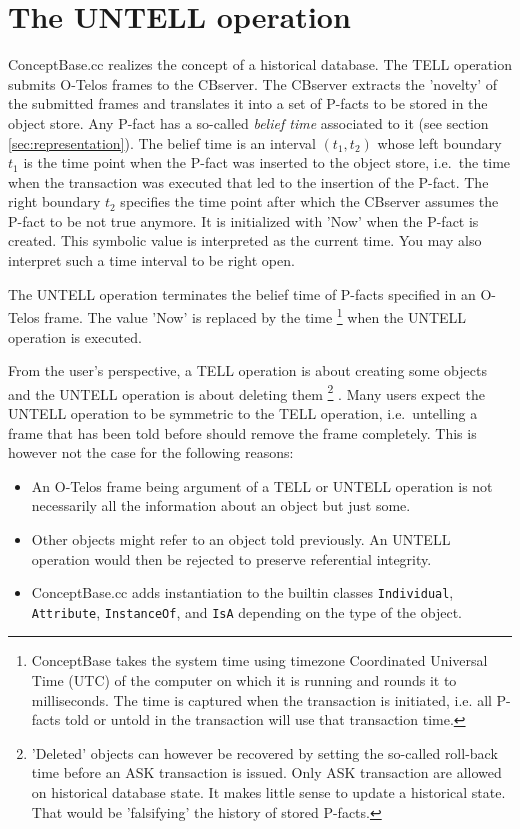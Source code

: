 \section{The UNTELL operation}
\label{sec:untell}

ConceptBase.cc realizes the concept of a historical database. The TELL operation
submits O-Telos frames to the CBserver. The CBserver extracts the 'novelty'
of the submitted frames and translates it into a set of P-facts to be stored
in the object store. Any P-fact has a so-called {\em belief time\/} associated to
it (see section \ref{sec:representation}). The belief time is an interval $(t_1,t_2)$ whose left boundary $t_1$ is the time point when
the P-fact was inserted to the object store, i.e.\ the time when the transaction
was executed that led to the insertion of the P-fact. The right boundary $t_2$ specifies
the time point after which the CBserver assumes the P-fact to be not true anymore.
It is initialized with 'Now' when the P-fact is created. This symbolic value
is interpreted as the current time. You may also interpret such a time interval to be right
open.

The UNTELL operation terminates the belief time of P-facts specified in an O-Telos
frame. The value
'Now' is replaced by the time%
\footnote{ConceptBase takes the system time using timezone Coordinated Universal Time (UTC) of the computer on
which it is running and rounds it to milliseconds. The time is captured when the transaction is initiated,
i.e. all P-facts told or untold in the transaction will use that transaction time.
}
when the UNTELL operation is executed. 

From the user's  perspective, a TELL operation is about creating some objects and
the UNTELL operation is about deleting them%
\footnote{ 'Deleted' objects can however be recovered
by setting the so-called roll-back time before an ASK transaction is issued.
Only ASK transaction are allowed on historical database state. It makes little
sense to update a historical state. That would be 'falsifying' the history of stored P-facts.}%
. Many users expect the UNTELL operation to be symmetric to the TELL operation,
i.e.\ untelling a frame that has been told before should remove the frame completely. 
This is however not the case for the following reasons:

\begin{itemize}
\item An O-Telos frame being argument of a TELL or UNTELL operation is not necessarily all
the information about an object but just some. 
\item Other objects might refer to an object told previously. An UNTELL operation would then
be rejected to preserve referential integrity.
\item ConceptBase.cc adds instantiation to the builtin classes {\tt Individual},
{\tt Attribute}, {\tt Instance\-Of}, and {\tt IsA} depending on the type of the object.
\end{itemize}

